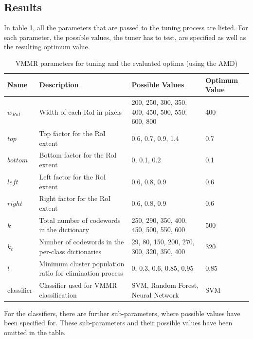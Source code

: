 \subsection{Results}\label{sec:results}
In table \ref{table:tunedParameters}, all the parameters that are passed to the tuning process are listed. For each parameter, the possible values, the tuner has to test, are specified as well as the resulting optimum value.
\begin{table}[btph]
    \centering
    \begin{tabular}{ | l | p{4cm} | p{6cm} | l |}
    \hline
    \textbf{Name} & \textbf{Description} & \textbf{Possible Values} & \textbf{Optimum Value} \\ \hline
    $w_{RoI}$    & Width of each RoI in pixels      & {200, 250, 300, 350, 400, 450, 500, 550, 600, 800} & 400 \\ \hline
    $top$      & Top factor for the RoI extent    & {0.6, 0.7, 0.9, 1.4}                               & 0.7 \\ \hline
    $bottom$   & Bottom factor for the RoI extent & {0, 0.1, 0.2}                                      & 0.1 \\ \hline
    $left$     & Left factor for the RoI extent   & {0.6, 0.8, 0.9}                                    & 0.6 \\ \hline
    $right$    & Right factor for the RoI extent  & {0.6, 0.8, 0.9}                                    & 0.6 \\ \hline
    $k$        & Total number of codewords in the dictionary & {250, 290, 350, 400, 450, 500, 550, 600} & 500 \\ \hline
    $k_c$      & Number of codewords in the per-class dictionaries & {29, 80, 150, 200, 270, 300, 320, 350, 400} & 320 \\ \hline
    $t$        & Minimum cluster population ratio for elimination process & {0, 0.3, 0.6, 0.85, 0.95}  & 0.85 \\ \hline
    classifier & Classifier used for VMMR classification & {SVM, Random Forest, Neural Network}        & SVM \\ \hline
    \end{tabular}
    \caption{VMMR parameters for tuning and the evaluated optima (using the AMD)}
    \label{table:tunedParameters}
\end{table}
For the classifiers, there are further sub-parameters, where possible values have been specified for. These sub-parameters and their possible values have been omitted in the table.


